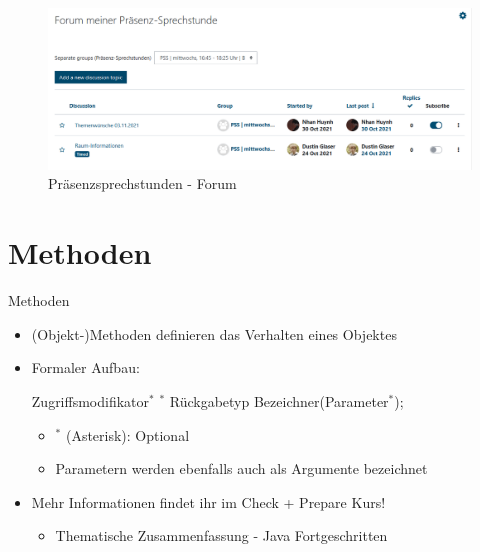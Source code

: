 \documentclass{../tuda-beamer}
\begin{document}
    \begin{frame}[c]
        \begin{figure}[h]
            \centering
            \includegraphics[width=\linewidth]{graphics/pss_themenwuensche.png}
            \caption{Präsenzsprechstunden - Forum}
        \end{figure}
    \end{frame}


    \section{Methoden}
    \begin{frame}{Methoden}
        \begin{itemize}
            \item (Objekt-)Methoden definieren das Verhalten eines Objektes
            \item Formaler Aufbau:

            \begin{center}
                Zugriffsmodifikator\(^*\)  \(^*\)  Rückgabetyp
                Bezeichner(Parameter\(^*\));
            \end{center}

            \begin{itemize}
                \item \(^*\) (Asterisk): Optional
                \item Parametern werden ebenfalls auch als Argumente bezeichnet
            \end{itemize}
            \item Mehr Informationen findet ihr im Check + Prepare Kurs!
            \begin{itemize}
                \item Thematische Zusammenfassung -  Java Fortgeschritten
            \end{itemize}
        \end{itemize}
    \end{frame}
\end{document}
